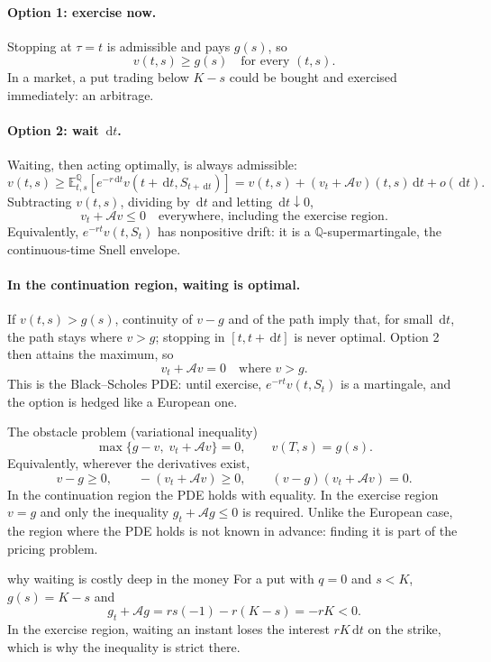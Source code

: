 \documentclass[10pt]{article}
\newcommand{\E}{\mathbb E}
\newcommand{\Q}{\mathbb Q}
\newcommand{\1}{\mathbf 1}
\newcommand{\dd}{\,\mathrm d}
\theoremstyle{definition}
\begin{document}
\paragraph{Option 1: exercise now.}
Stopping at \(\tau=t\) is admissible and pays \(g(s)\), so
\[
\boxed{v(t,s)\geq g(s)\quad\text{for every }(t,s).}
\]
In a market, a put trading below \(K-s\) could be bought and exercised
immediately: an arbitrage.

\paragraph{Option 2: wait \(\dd t\).}
Waiting, then acting optimally, is always admissible:
\[
v(t,s)\geq\E^\Q_{t,s}\!\left[e^{-r\dd t}v(t+\dd t,S_{t+\dd t})\right]
=v(t,s)+(v_t+\mathcal Av)(t,s)\dd t+o(\dd t).
\]
Subtracting \(v(t,s)\), dividing by \(\dd t\) and letting \(\dd t\downarrow0\),
\[
\boxed{v_t+\mathcal Av\leq0\quad\text{everywhere, including the exercise region.}}
\]
Equivalently, \(e^{-rt}v(t,S_t)\) has nonpositive drift: it is a
\(\Q\)-supermartingale, the continuous-time Snell envelope.

\paragraph{In the continuation region, waiting is optimal.}
If \(v(t,s)>g(s)\), continuity of \(v-g\) and of the path imply that, for
small \(\dd t\), the path stays where \(v>g\); stopping in
\([t,t+\dd t]\) is never optimal. Option 2 then attains the maximum, so
\[
\boxed{v_t+\mathcal Av=0\quad\text{where }v>g.}
\]
This is the Black--Scholes PDE: until exercise, \(e^{-rt}v(t,S_t)\) is a
martingale, and the option is hedged like a European one.

\begin{keyidea}{The obstacle problem (variational inequality)}
\[
\boxed{
\max\{g-v,\;v_t+\mathcal Av\}=0,\qquad v(T,s)=g(s).}
\]
Equivalently, wherever the derivatives exist,
\[
v-g\geq0,\qquad -(v_t+\mathcal Av)\geq0,\qquad
(v-g)(v_t+\mathcal Av)=0.
\]
In the continuation region the PDE holds with equality. In the exercise
region \(v=g\) and only the inequality \(g_t+\mathcal Ag\leq0\) is required.
Unlike the European case, the region where the PDE holds is not known in
advance: finding it is part of the pricing problem.
\end{keyidea}

\begin{boardexample}{why waiting is costly deep in the money}
For a put with \(q=0\) and \(s<K\), \(g(s)=K-s\) and
\[
g_t+\mathcal Ag=rs(-1)-r(K-s)=-rK<0.
\]
In the exercise region, waiting an instant loses the interest \(rK\dd t\) on
the strike, which is why the inequality is strict there.
\end{boardexample}
\end{document}
